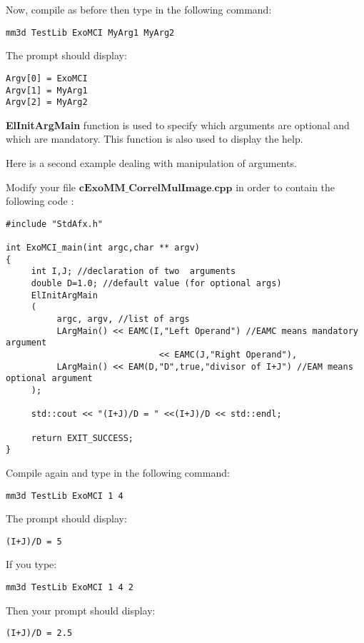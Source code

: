 \documentclass[a4paper]{book}
\begin{document}
Now, compile as before then type in the following command: 
\begin{lstlisting}
mm3d TestLib ExoMCI MyArg1 MyArg2
\end{lstlisting}

The prompt should display:\newline

\begin{lstlisting}
Argv[0] = ExoMCI 
Argv[1] = MyArg1 
Argv[2] = MyArg2
\end{lstlisting}

\textbf{ElInitArgMain} function is used to specify which arguments are optional and which are mandatory. This function is also used to display the help. \newline

Here is a second example dealing with manipulation of arguments.\newline

Modify your file $\textbf{cExoMM\_CorrelMulImage.cpp}$ in order to contain the following code :

\begin{lstlisting}
#include "StdAfx.h" 

int ExoMCI_main(int argc,char ** argv) 
{ 
     int I,J; //declaration of two  arguments 
     double D=1.0; //default value (for optional args)
     ElInitArgMain 
     ( 
          argc, argv, //list of args 
          LArgMain() << EAMC(I,"Left Operand") //EAMC means mandatory argument 
                              << EAMC(J,"Right Operand"),    	
          LArgMain() << EAM(D,"D",true,"divisor of I+J") //EAM means optional argument 
     ); 
     
     std::cout << "(I+J)/D = " <<(I+J)/D << std::endl;
     
     return EXIT_SUCCESS; 
}
\end{lstlisting}

Compile again and type in the following command:
\begin{lstlisting}
mm3d TestLib ExoMCI 1 4
\end{lstlisting}

The prompt should display:
\begin{lstlisting}
(I+J)/D = 5
\end{lstlisting}

If you type:
\begin{lstlisting}
mm3d TestLib ExoMCI 1 4 2
\end{lstlisting} 

Then your prompt should display:
\begin{lstlisting}
(I+J)/D = 2.5
\end{lstlisting}
\end{document}
